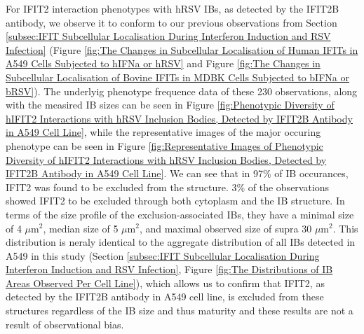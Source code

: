 For IFIT2 interaction phenotypes with hRSV IBs, as detected by the IFIT2B antibody, we observe it to conform to our previous observations from Section \ref{subsec:IFIT Subcellular Localisation During Interferon Induction and RSV Infection} (Figure \ref{fig:The Changes in Subcellular Localisation of Human IFITs in A549 Cells Subjected to hIFNa or hRSV} and Figure \ref{fig:The Changes in Subcellular Localisation of Bovine IFITs in MDBK Cells Subjected to bIFNa or bRSV}). The underlyig phenotype frequence data of these 230 observations, along with the measired IB sizes can be seen in Figure \ref{fig:Phenotypic Diversity of hIFIT2 Interactions with hRSV Inclusion Bodies, Detected by IFIT2B Antibody in A549 Cell Line}, while the representative images of the major occuring phenotype can be seen in Figure \ref{fig:Representative Images of Phenotypic Diversity of hIFIT2 Interactions with hRSV Inclusion Bodies, Detected by IFIT2B Antibody in A549 Cell Line}. We can see that in 97\% of IB occurances, IFIT2 was found to be excluded from the structure. 3\% of the observations showed IFIT2 to be excluded through both cytoplasm and the IB structure. In terms of the size profile of the exclusion-associated IBs, they have a minimal size of 4 \(\mu \mbox{m}^2\), median size of 5 \(\mu \mbox{m}^2\), and maximal observed size of supra 30 \(\mu \mbox{m}^2\). This distribution is neraly identical to the aggregate distribution of all IBs detected in A549 in this study (Section \ref{subsec:IFIT Subcellular Localisation During Interferon Induction and RSV Infection}, Figure \ref{fig:The Distributions of IB Areas Observed Per Cell Line}), which allows us to confirm that IFIT2, as detected by the IFIT2B antibody in A549 cell line, is excluded from these structures regardless of the IB size and thus maturity and these results are not a result of observational bias.

